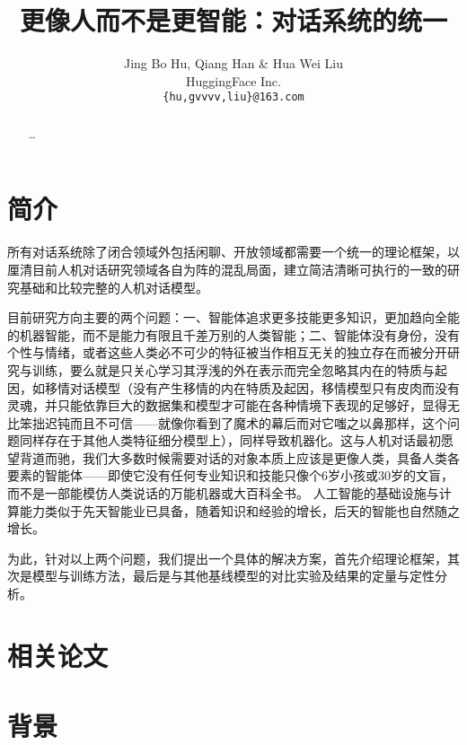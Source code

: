 \documentclass[letterpaper]{article} %
\begin{document}
\begin{CJK*}{UTF8}{gbsn}

\title{更像人而不是更智能：对话系统的统一}
\author{Jing Bo Hu, Qiang Han \& Hua Wei Liu \\
HuggingFace  Inc.\\
{\tt \{hu,gvvvv,liu\}@163.com} \\}

\maketitle
\begin{abstract}
  \ldots
\end{abstract}

\section{简介}
所有对话系统除了闭合领域外包括闲聊、开放领域都需要一个统一的理论框架，以厘清目前人机对话研究领域各自为阵的混乱局面，建立简洁清晰可执行的一致的研究基础和比较完整的人机对话模型。

目前研究方向主要的两个问题：一、智能体追求更多技能更多知识，更加趋向全能的机器智能，而不是能力有限且千差万别的人类智能；二、智能体没有身份，没有个性与情绪，或者这些人类必不可少的特征被当作相互无关的独立存在而被分开研究与训练，要么就是只关心学习其浮浅的外在表示而完全忽略其内在的特质与起因，如移情对话模型（没有产生移情的内在特质及起因，移情模型只有皮肉而没有灵魂，并只能依靠巨大的数据集和模型才可能在各种情境下表现的足够好，显得无比笨拙迟钝而且不可信——就像你看到了魔术的幕后而对它嗤之以鼻那样，这个问题同样存在于其他人类特征细分模型上），同样导致机器化。这与人机对话最初愿望背道而驰，我们大多数时候需要对话的对象本质上应该是更像人类，具备人类各要素的智能体——即使它没有任何专业知识和技能只像个6岁小孩或30岁的文盲，而不是一部能模仿人类说话的万能机器或大百科全书。
人工智能的基础设施与计算能力类似于先天智能业已具备，随着知识和经验的增长，后天的智能也自然随之增长。

为此，针对以上两个问题，我们提出一个具体的解决方案，首先介绍理论框架，其次是模型与训练方法，最后是与其他基线模型的对比实验及结果的定量与定性分析。

\section{相关论文}

\section{背景}


\end{CJK*}
\end{document}
